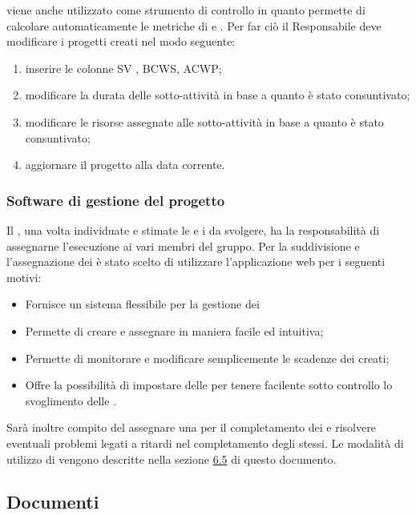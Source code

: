 \documentclass[12pt,a4paper]{article}
\begin{document}
 viene anche utilizzato come strumento di controllo in quanto permette di calcolare automaticamente le metriche di \textit{} e \textit{}. Per far ciò il Responsabile deve modificare i progetti creati nel modo seguente:
\begin{enumerate}
	\item inserire le colonne SV , BCWS, ACWP;
	\item modificare la durata delle sotto-attività in base a quanto è stato consuntivato;
	\item modificare le risorse assegnate alle sotto-attività in base a quanto è stato consuntivato;
	\item aggiornare il progetto alla data corrente.
\end{enumerate}

\subsubsection{Software di gestione del progetto}\label{swGestioneProgetto}
Il \PM{}, una volta individuate e stimate le  e i \textit{} da svolgere, ha la responsabilità di assegnarne l'esecuzione ai vari membri del gruppo. Per la suddivisione e l'assegnazione dei \textit{} è stato scelto di utilizzare l'applicazione web  per i seguenti motivi: 
\begin{itemize}
	\item Fornisce un sistema flessibile per la gestione dei \textit{}
	\item Permette di creare e assegnare \textit{} in maniera facile ed intuitiva; 
	\item Permette di monitorare e modificare semplicemente le scadenze dei \textit{} creati;
	\item Offre la possibilità di impostare delle \textit{} per tenere facilente sotto controllo lo svoglimento delle .
\end{itemize}
Sarà inoltre compito del \PM{} assegnare una \textit{} per il completamento dei \textit{} e risolvere eventuali problemi legati a ritardi nel completamento degli stessi.
Le modalità di utilizzo di \textit{} vengono descritte nella sezione \hyperref[ticket]{6.5} di questo documento.


\subsection{Documenti}
\end{document}
